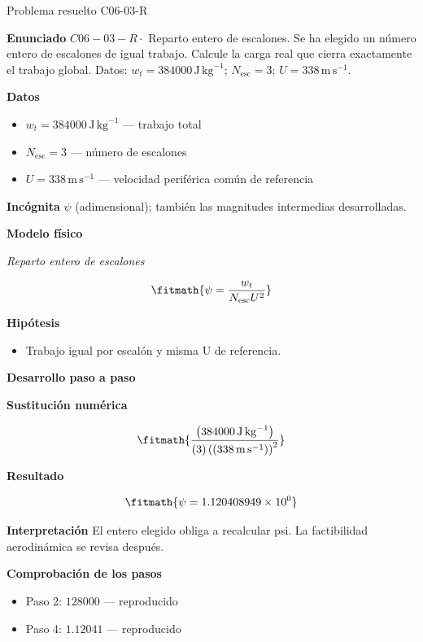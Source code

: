 \documentclass[10pt,openany]{book}
\begin{document}
\begin{studiumworked}{Problema resuelto C06-03-R}


\noindent\textbf{Enunciado}
\(C06-03-R \cdot\) Reparto entero de escalones. Se ha elegido un número entero de escalones de igual trabajo. Calcule la carga real que cierra exactamente el trabajo global. Datos: \(w_t=384000\, \mathrm{J}\,\mathrm{kg}^{-1}\); \(N_{\mathrm{esc}}=3\); \(U=338\, \mathrm{m}\,\mathrm{s}^{-1}\).

\noindent\textbf{Datos}
\begin{itemize}
\item $w_t = 384000\,\mathrm{J}\,\mathrm{kg}^{-1}$ — trabajo total
\item $N_{\mathrm{esc}} = 3$ — número de escalones
\item $U = 338\,\mathrm{m}\,\mathrm{s}^{-1}$ — velocidad periférica común de referencia
\end{itemize}

\noindent\textbf{Incógnita}
$\psi$ (adimensional); también las magnitudes intermedias desarrolladas.

\noindent\textbf{Modelo físico}

\noindent\textit{Reparto entero de escalones}

\[
\fitmath{\psi=\frac{w_t}{N_{\mathrm{esc}} U^{2}}}
\]

\noindent\textbf{Hipótesis}
\begin{itemize}
\item Trabajo igual por escalón y misma U de referencia.
\end{itemize}

\noindent\textbf{Desarrollo paso a paso}



\noindent\textbf{Sustitución numérica}

\[
\fitmath{\frac{\left(384000\,\mathrm{J}\,\mathrm{kg}^{-1}\right)}{\left(3\right) \left(\left(338\,\mathrm{m}\,\mathrm{s}^{-1}\right)\right)^{2}}}
\]

\noindent\textbf{Resultado}

\[
\fitmath{\psi=1.120408949\times10^{0}}
\]

\noindent\textbf{Interpretación}
El entero elegido obliga a recalcular psi. La factibilidad aerodinámica se revisa después.

\noindent\textbf{Comprobación de los pasos}
\begin{itemize}
\item Paso 2: $128000$ — reproducido
\item Paso 4: $1.12041$ — reproducido
\end{itemize}


\end{studiumworked}
\end{document}
